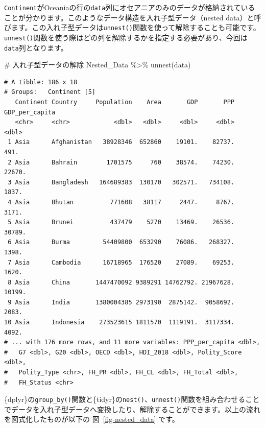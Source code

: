 \documentclass[
  a4paper,
  pandoc,
  ja=standard,
  jafont=haranoaji]{bxjsbook}
\newenvironment{Shaded}{\begin{snugshade}}{\end{snugshade}}
\newcommand{\CommentTok}[1]{\textcolor[rgb]{0.37,0.37,0.37}{#1}}
\newcommand{\FunctionTok}[1]{\textcolor[rgb]{0.28,0.35,0.67}{#1}}
\newcommand{\NormalTok}[1]{\textcolor[rgb]{0.00,0.48,0.65}{#1}}
\newcommand{\SpecialCharTok}[1]{\textcolor[rgb]{0.37,0.37,0.37}{#1}}
\begin{document}
\texttt{Continent}がOceaniaの行の\texttt{data}列にオセアニアのみのデータが格納されていることが分かります。このようなデータ構造を入れ子型データ（nested
data）と呼びます。この入れ子型データは\texttt{unnest()}関数を使って解除することも可能です。\texttt{unnest()}関数を使う際はどの列を解除するかを指定する必要があり、今回は\texttt{data}列となります。

\begin{Shaded}
\begin{Highlighting}[numbers=left,,]
\CommentTok{\# 入れ子型データの解除}
\NormalTok{Nested\_Data }\SpecialCharTok{\%\textgreater{}\%}
  \FunctionTok{unnest}\NormalTok{(data)}
\end{Highlighting}
\end{Shaded}

\begin{verbatim}
# A tibble: 186 x 18
# Groups:   Continent [5]
   Continent Country     Population    Area       GDP       PPP GDP_per_capita
   <chr>     <chr>            <dbl>   <dbl>     <dbl>     <dbl>          <dbl>
 1 Asia      Afghanistan   38928346  652860    19101.    82737.           491.
 2 Asia      Bahrain        1701575     760    38574.    74230.         22670.
 3 Asia      Bangladesh   164689383  130170   302571.   734108.          1837.
 4 Asia      Bhutan          771608   38117     2447.     8767.          3171.
 5 Asia      Brunei          437479    5270    13469.    26536.         30789.
 6 Asia      Burma         54409800  653290    76086.   268327.          1398.
 7 Asia      Cambodia      16718965  176520    27089.    69253.          1620.
 8 Asia      China       1447470092 9389291 14762792. 21967628.         10199.
 9 Asia      India       1380004385 2973190  2875142.  9058692.          2083.
10 Asia      Indonesia    273523615 1811570  1119191.  3117334.          4092.
# ... with 176 more rows, and 11 more variables: PPP_per_capita <dbl>,
#   G7 <dbl>, G20 <dbl>, OECD <dbl>, HDI_2018 <dbl>, Polity_Score <dbl>,
#   Polity_Type <chr>, FH_PR <dbl>, FH_CL <dbl>, FH_Total <dbl>,
#   FH_Status <chr>
\end{verbatim}

\{dplyr\}の\texttt{group\_by()}関数と\{tidyr\}の\texttt{nest()}、\texttt{unnest()}関数を組み合わせることでデータを入れ子型データへ変換したり、解除することができます。以上の流れを図式化したものが以下の
図~\ref{fig-nested_data} です。
\end{document}
